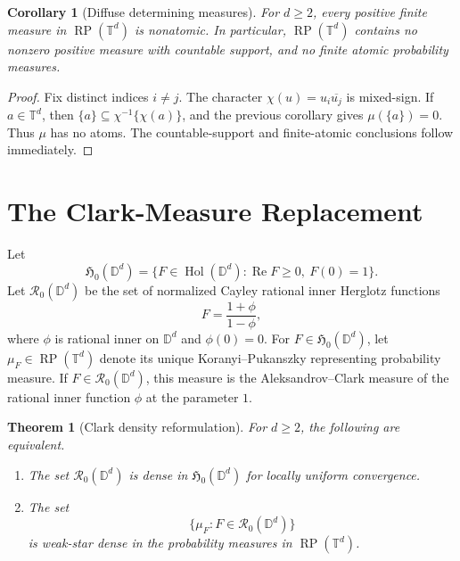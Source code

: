 \documentclass[11pt]{article}
\newtheorem{theorem}{Theorem}
\newtheorem{corollary}{Corollary}
\newcommand{\D}{\mathbb D}
\newcommand{\T}{\mathbb T}
\newcommand{\RP}{\operatorname{RP}}
\newcommand{\Hol}{\operatorname{Hol}}
\begin{document}
\begin{corollary}[Diffuse determining measures]
For \(d\geq2\), every positive finite measure in \(\RP(\T^d)\) is
nonatomic.  In particular, \(\RP(\T^d)\) contains no nonzero positive
measure with countable support, and no finite atomic probability measures.
\end{corollary}

\begin{proof}
Fix distinct indices \(i\neq j\).  The character
\(\chi(u)=u_i\overline{u_j}\) is mixed-sign.  If \(a\in\T^d\), then
\(\{a\}\subseteq \chi^{-1}\{\chi(a)\}\), and the previous corollary gives
\(\mu(\{a\})=0\).  Thus \(\mu\) has no atoms.  The countable-support and
finite-atomic conclusions follow immediately.
\end{proof}

\section*{The Clark-Measure Replacement}

Let
\[
  \mathfrak H_0(\D^d)=
  \{F\in\Hol(\D^d): \operatorname{Re}F\geq0,\ F(0)=1\}.
\]
Let \(\mathcal R_0(\D^d)\) be the set of normalized Cayley rational inner
Herglotz functions
\[
  F=\frac{1+\phi}{1-\phi},
\]
where \(\phi\) is rational inner on \(\D^d\) and \(\phi(0)=0\).  For
\(F\in\mathfrak H_0(\D^d)\), let \(\mu_F\in\RP(\T^d)\) denote its unique
Koranyi--Pukanszky representing probability measure.  If
\(F\in\mathcal R_0(\D^d)\), this measure is the Aleksandrov--Clark measure
of the rational inner function \(\phi\) at the parameter \(1\).

\begin{theorem}[Clark density reformulation]
For \(d\geq2\), the following are equivalent.
\begin{enumerate}
\item The set \(\mathcal R_0(\D^d)\) is dense in
\(\mathfrak H_0(\D^d)\) for locally uniform convergence.
\item The set
\[
  \{\mu_F:F\in\mathcal R_0(\D^d)\}
\]
is weak-star dense in the probability measures in \(\RP(\T^d)\).
\end{enumerate}
\end{theorem}
\end{document}

